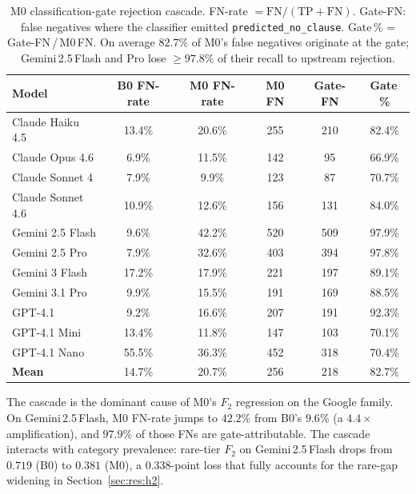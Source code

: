 \begin{table}[htbp]
  \centering
  \small
  \caption{M0 classification-gate rejection cascade. FN-rate $= \mathrm{FN}/(\mathrm{TP}+\mathrm{FN})$.
  Gate-FN: false negatives where the classifier emitted
  \texttt{predicted\_no\_clause}. Gate\,\% = Gate-FN\,/\,M0\,FN.
  On average $82.7\%$ of M0's false negatives originate at the gate;
  Gemini\,2.5\,Flash and Pro lose ${\geq}97.8\%$ of their recall to upstream
  rejection.}
  \label{tab:cascade}
  \begin{tabular*}{\linewidth}{@{\extracolsep{\fill}}lccccc@{}}
    \toprule
    \textbf{Model}
    & \textbf{B0 FN-rate} & \textbf{M0 FN-rate} & \textbf{M0 FN}
    & \textbf{Gate-FN} & \textbf{Gate\,\%} \\
    \midrule
    Claude Haiku 4.5   & 13.4\% & 20.6\% & 255 & 210 & 82.4\% \\
    Claude Opus 4.6    &  6.9\% & 11.5\% & 142 &  95 & 66.9\% \\
    Claude Sonnet 4    &  7.9\% &  9.9\% & 123 &  87 & 70.7\% \\
    Claude Sonnet 4.6  & 10.9\% & 12.6\% & 156 & 131 & 84.0\% \\
    Gemini 2.5 Flash   &  9.6\% & 42.2\% & 520 & 509 & 97.9\% \\
    Gemini 2.5 Pro     &  7.9\% & 32.6\% & 403 & 394 & 97.8\% \\
    Gemini 3 Flash     & 17.2\% & 17.9\% & 221 & 197 & 89.1\% \\
    Gemini 3.1 Pro     &  9.9\% & 15.5\% & 191 & 169 & 88.5\% \\
    GPT-4.1            &  9.2\% & 16.6\% & 207 & 191 & 92.3\% \\
    GPT-4.1 Mini       & 13.4\% & 11.8\% & 147 & 103 & 70.1\% \\
    GPT-4.1 Nano       & 55.5\% & 36.3\% & 452 & 318 & 70.4\% \\
    \midrule
    \textbf{Mean}      & 14.7\% & 20.7\% & 256 & 218 & 82.7\% \\
    \bottomrule
  \end{tabular*}
\end{table}

The cascade is the dominant cause of M0's $F_2$ regression on the Google
family. On Gemini\,2.5\,Flash, M0 FN-rate jumps to $42.2\%$ from B0's $9.6\%$
(a $4.4{\times}$ amplification), and $97.9\%$ of those FNs are
gate-attributable. The cascade interacts with category prevalence: rare-tier
$F_2$ on Gemini\,2.5\,Flash drops from $0.719$ (B0) to $0.381$ (M0), a
$0.338$-point loss that fully accounts for the rare-gap widening in
Section~\ref{sec:res:h2}.

